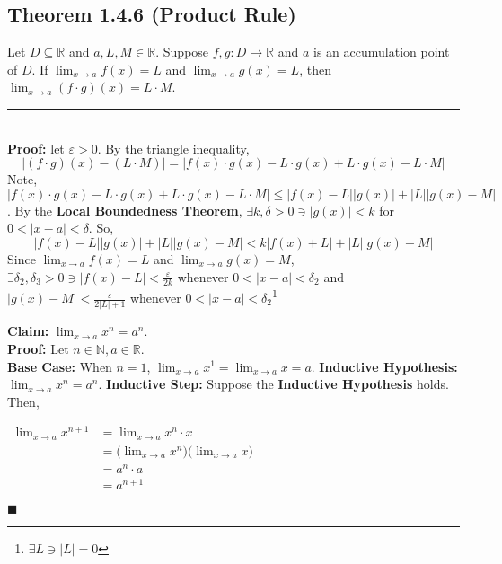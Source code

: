\documentclass[11pt]{book}
\newcommand{\R}{\mathbb{R}}
\newcommand{\N}{\mathbb{N}}
\newcommand{\horline}{\noindent\rule{14.25cm}{0.6pt}\\}
\newcommand{\QED}{\begin{flushright}$\blacksquare$\end{flushright}}
\begin{document}
	\subsection{Theorem 1.4.6 (Product Rule)}
		\begin{theor}
			Let $D \subseteq \R$ and $a,L,M \in \R$. Suppose $f,g:D \to \R$ and $a$ is an accumulation point of $D$. If $\displaystyle\lim_{x \to a}{f(x) = L}$ and
			$\displaystyle\lim_{x \to a}{g(x) = L}$, then $\displaystyle\lim_{x \to a}{(f \cdot g)(x) = L \cdot M}$.\\
			\horline
			\textbf{Proof:} let $\varepsilon > 0$. By the triangle inequality, $$|(f \cdot g)(x) - (L \cdot M)|  = |f(x) \cdot g(x) - L \cdot g(x) 
			+ L \cdot g(x) - L \cdot M|$$
			Note, $|f(x) \cdot g(x) - L \cdot g(x) + L \cdot g(x) - L \cdot M| \leq |f(x) - L||g(x)| + |L||g(x) - M|$. By the \textbf{Local Boundedness Theorem},
			$\exists k, \delta > 0 \ni |g(x)| < k$ for $0 < | x - a| < \delta$. So,
			$$|f(x) - L||g(x)| + |L||g(x) - M| < k|f(x) + L| + |L||g(x) - M|$$
			Since $\displaystyle\lim_{x \to a}{f(x) = L}$ and $\displaystyle\lim_{x \to a}{g(x) = M}$, $\exists \delta_2, \delta_3 > 0 \ni |f(x) - L| < 
			\frac{\varepsilon}{2k}$ whenever $0 < |x - a| < \delta_2$ and $|g(x) - M| < \frac{\varepsilon}{2|L| + 1}$ whenever $0 < |x - a| < \delta_2$\footnote{
			$\exists L \ni |L| = 0$}
		\end{theor}
		\begin{examp}
			\textbf{Claim:} $\displaystyle\lim_{x \to a}{x^n = a^n}$.\\
			\textbf{Proof:} Let $n \in \N, a \in \R$.\\
			\textbf{Base Case:} When $n = 1$, $\lim_{x \to a}{x^1 = \lim_{x \to a}{x} = a}$.
			\textbf{Inductive Hypothesis:} $\displaystyle\lim_{x \to a}{x^n} = a^n$.
			\textbf{Inductive Step:} Suppose the \textbf{Inductive Hypothesis} holds. Then,
			\begin{center}
				\begin{math}
					\begin{aligned}
						\displaystyle\lim_{x \to a}{x^{n+1}} & = \displaystyle\lim_{x \to a}{x^n \cdot x}\\
						& = \bigg(\displaystyle\lim_{x \to a}{x^n}\bigg)\bigg(\displaystyle\lim_{x \to a}{x}\bigg)\\
						& = a^n \cdot a\\
						& = a^{n+1}
					\end{aligned}
				\end{math}
			\end{center}
			\QED
		\end{examp}
	\newpage
\end{document}
